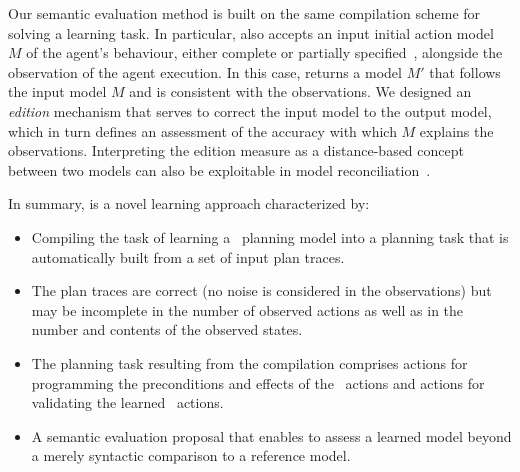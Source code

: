 Our semantic evaluation method is built on the same compilation scheme for solving a learning task. In particular, \FAMA also accepts an input initial action model $M$ of the agent's behaviour, either complete or partially specified~\cite{ZhuoNK13,ZhuoK17}, alongside the observation of the agent execution. In this case, \FAMA returns a model $M'$ that follows the input model $M$ and is consistent with the observations. We designed an {\em edition} mechanism that serves to correct the input model to the output model, which in turn defines an assessment of the accuracy with which $M$ explains the observations. Interpreting the edition measure as a distance-based concept between two models can also be exploitable in model reconciliation~\cite{KulkarniCZVZK16}.




\textcolor[rgb]{1.00,0.00,0.00}{In summary, \FAMA is a novel learning approach characterized by:
\begin{itemize}
\item Compiling the task of learning a \strips\ planning model into a planning task that is automatically built from a set of input plan traces.
\item The plan traces are correct (no noise is considered in the observations) but may be incomplete in the number of observed actions as well as in the number and contents of the observed states.
\item The planning task resulting from the compilation comprises actions for programming the preconditions and effects of the \strips\ actions and actions for validating the learned \strips\ actions.
\item A semantic evaluation proposal that enables to assess a learned model beyond a merely syntactic comparison to a reference model.
\end{itemize} }

